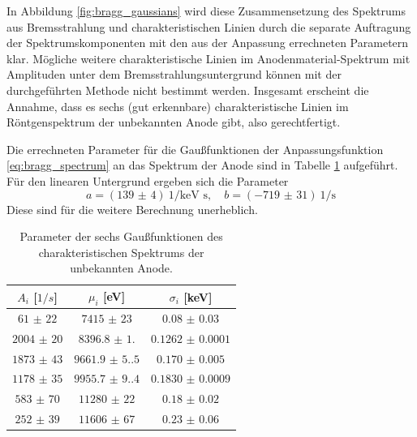 
In Abbildung \ref{fig:bragg_gaussians} wird diese Zusammensetzung des Spektrums aus Bremsstrahlung und charakteristischen Linien durch die separate Auftragung der Spektrumskomponenten mit den aus der Anpassung errechneten Parametern klar. Mögliche weitere charakteristische Linien im Anodenmaterial-Spektrum mit Amplituden unter dem Bremsstrahlungsuntergrund können mit der durchgeführten Methode nicht bestimmt werden. Insgesamt erscheint die Annahme, dass es sechs (gut erkennbare) charakteristische Linien im Röntgenspektrum der unbekannten Anode gibt, also gerechtfertigt.


Die errechneten Parameter für die Gaußfunktionen der Anpassungsfunktion \ref{eq:bragg_spectrum} an das Spektrum der Anode sind in Tabelle \ref{tab:bragg_params} aufgeführt. Für den linearen Untergrund ergeben sich die Parameter
\[
a = (\num{139(4)}) ~\text{1/keV s}, \quad b = (\num{-719(31)}) ~\text{1/s}
\]
Diese sind für die weitere Berechnung unerheblich.

\begin{table}[H]
	\centering
	\begin{tabular}{|c|c|c|} \hline
    $A_i$ [$\unit{1/s}$] & $\mu_i$ [eV] & $\sigma_i$ [keV] \\ \hline
    $\num{61(22)}$ & $\num{7415(23)}$ & $\num{0.08(3)}$ \\
    $\num{2004(20)}$ & $\num{8396.8(1.0)}$ & $\num{0.1262(1)}$ \\
    $\num{1873(43)}$ & $\num{9661.9(5.5)}$ & $\num{0.170(5)}$ \\
    $\num{1178(35)}$ & $\num{9955.7(9.4)}$ & $\num{0.1830(9)}$ \\
    $\num{583(70)}$ & $\num{11280(22)}$ & $\num{0.18(2)}$ \\
    $\num{252(39)}$ & $\num{11606(67)}$ & $\num{0.23(6)}$ \\
    \hline
	\end{tabular}
	\caption{Parameter der sechs Gaußfunktionen des charakteristischen Spektrums der unbekannten Anode.}
	\label{tab:bragg_params}
\end{table}


